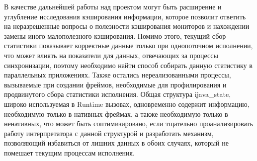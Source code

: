 В качестве дальнейшей работы над проектом могут быть расширение и углубление исследования кэширования информации, которое позволит ответить на неразрешенные вопросы о полезности кэширования мониторов и нахождении замены иного малополезного кэширования. Помимо этого, текущий сбор статистики показывает корректные данные только при однопоточном исполнении, что может влиять на показатели для данных, отвечающих за процессы синхронизации, поэтому необходимо найти способ собирать данную статистику в параллельных приложениях. Также остались нереализованными процессы, вызываемые при создании фреймов, необходимые для профилирования и продвинутого сбора статистики исполнения. Общая структура ijava\_state, широко используемая в Runtime вызовах, одновременно содержит информацию, необходимую только в нативных фреймах, а также необходимую только в ненативных, что может быть соптимизировано, если тщательно проанализировать работу интерпретатора с данной структурой и разработать механизм, позволяющий избавиться от лишних данных в обоих случаях, который не помешает текущим процессам исполнения.